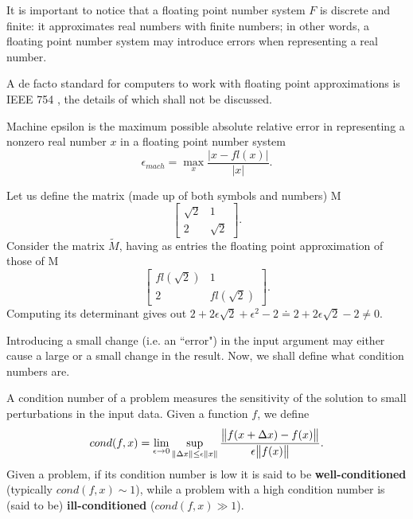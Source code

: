 It is important to notice that a floating point number system \(F\) is discrete and finite: it approximates real numbers with
finite numbers; in other words, a floating point number system may introduce errors when representing a real number.

A de facto standard for computers to work with floating point approximations is IEEE 754 \cite{ieeefp}, the details of which
shall not be discussed.

\begin{definition}
    Machine epsilon is the maximum possible absolute relative error in representing a nonzero real number \(x\) in a
    floating point number system
    \[\epsilon_{mach} = \max \limits_{x} \dfrac{\vert x - fl(x) \vert}{\vert x \vert}.\]
\end{definition}

\begin{example}
    Let us define the matrix (made up of both symbols and numbers) M
    \[
        \begin{bmatrix}
            \sqrt{2}  &   1    \\
                2     & \sqrt{2}
        \end{bmatrix}.
    \]
    Consider the matrix \( \tilde{M} \), having as entries the floating point approximation of those of M
    \[
        \begin{bmatrix}
            fl(\sqrt{2})      &         1      \\
                2             &    fl(\sqrt{2})
        \end{bmatrix}.
    \]
    Computing its determinant gives out \( 2  +2\epsilon\sqrt{2} + \epsilon^2 - 2 \doteq 2 + 2\epsilon\sqrt{2} -2 \neq 0 \).
\end{example}

Introducing a small change (i.e. an ``error") in the input argument may either cause a large or a small change in the result.
Now, we shall define what condition numbers are.

\begin{definition}
    A condition number of a problem measures the sensitivity of the solution to small perturbations in the input data.
    Given a function \(f \), we define
    \[
        cond(f, x) = \lim_{\epsilon \to 0} \sup \limits_{\norm{\Delta x} \leq \epsilon \norm{x}}
        \dfrac{\norm{f(x+\Delta x) - f(x)}}{\epsilon \norm{f(x)}}.
    \]
    Given a problem, if its condition number is low it is said to be \textbf{well-conditioned}
    (typically \( cond(f, x) \sim 1 \)), while a problem with a high condition number is (said to be)
    \textbf{ill-conditioned} (\( cond(f, x) \gg 1 \)).
\end{definition}

